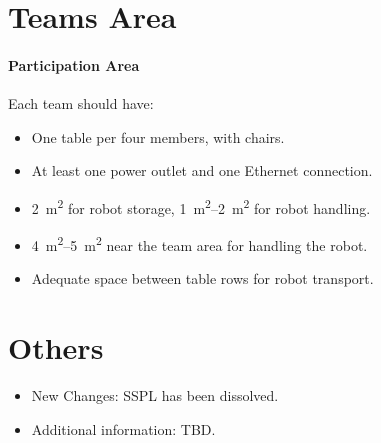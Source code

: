 \section{Teams Area}
\paragraph{Participation Area} Each team should have:
\begin{itemize}
    \item One table per four members, with chairs.
    \item At least one power outlet and one Ethernet connection.
    \item \qty{2}{\metre\squared} for robot storage, \qtyrange{1}{2}{\metre\squared} for robot handling.
    \item \qtyrange{4}{5}{\metre\squared}  near the team area for handling the robot.
    \item Adequate space between table rows for robot transport.
\end{itemize}

\section{Others}
\begin{itemize}
    \item New Changes: SSPL has been dissolved.
    \item Additional information: TBD.
\end{itemize}

